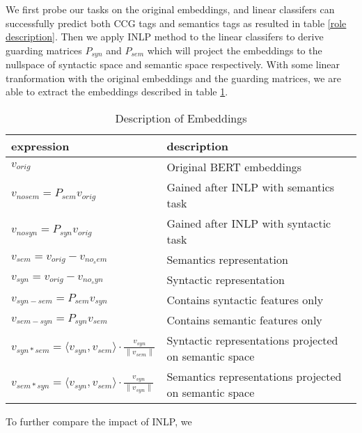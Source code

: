 \documentclass[11pt,a4paper]{article}
\begin{document}
We first probe our tasks on the original embeddings, and linear classifers can successfully predict both CCG tags and semantics tags as resulted in table \ref{role description}. Then we apply INLP method to the linear classifers to derive guarding matrices $P_{syn}$ and $P_{sem}$ which will project the embeddings to the nullspace of syntactic space and semantic space respectively. With some linear tranformation with the original embeddings and the guarding matrices, we are able to extract the embeddings described in table \ref{description}. 
\begin{table}[ht]
    \centering
    \begin{tabular}{p{4cm}p{3cm}}
        expression & description\\ \hline 
        $v_{orig}$ & Original BERT embeddings  \\
        $v_{nosem} = P_{sem} v_{orig}$ & Gained after INLP with semantics task \\
        $v_{nosyn}= P_{syn} v_{orig}$ & Gained after INLP with syntactic task \\
        $v_{sem} = v_{orig}-v_{no_sem}$ & Semantics representation \\
        $v_{syn} = v_{orig}-v_{no_syn}$ & Syntactic representation \\
        $v_{syn-sem} = P_{sem} v_{syn}$ &Contains syntactic features only \\
        $v_{sem-syn} = P_{syn} v_{sem}$ &Contains semantic features only \\
        $v_{syn*sem} = \langle v_{syn}, v_{sem} \rangle \cdot \frac{v_{syn}}{\|v_{sem}\|}$ & Syntactic representations projected on semantic space\\
        $v_{sem*syn} = \langle v_{syn}, v_{sem} \rangle \cdot \frac{v_{syn}}{\|v_{syn}\|}$ & Semantics representations projected on semantic space\\

        
        
        \hline
    \end{tabular}
    \caption{\label{description} Description of Embeddings
    }
\end{table}

To further compare the impact of INLP, we 
\end{document}
